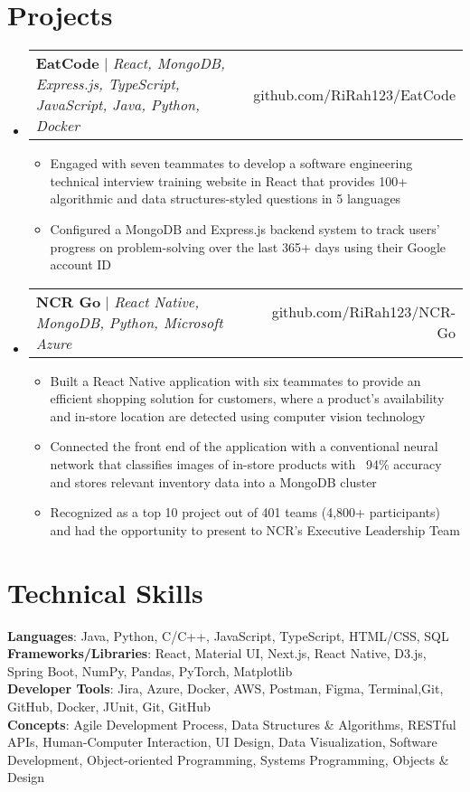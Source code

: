 \documentclass[letterpaper,10pt]{article}
\makeatletter
\newcommand{\resumeItem}[1]{
  \item\small{
    {#1 \vspace{-2pt}}
  }
}
\newcommand{\resumeProjectHeading}[2]{
    \item
    \begin{tabular*}{0.97\textwidth}{l@{\extracolsep{\fill}}r}
      \small#1 & #2 \\
    \end{tabular*}\vspace{-7pt}
}
\newcommand{\resumeSubHeadingListStart}{\begin{itemize}[leftmargin=0.15in, label={}]}
\newcommand{\resumeSubHeadingListEnd}{\end{itemize}}
\newcommand{\resumeItemListStart}{\begin{itemize}}
\newcommand{\resumeItemListEnd}{\end{itemize}\vspace{-5pt}}
\makeatother
\begin{document}
\section{Projects}
    \resumeSubHeadingListStart
      \resumeProjectHeading
          {\textbf{EatCode} $|$ \emph{React, MongoDB, Express.js, TypeScript, JavaScript, Java, Python, Docker}}{github.com/RiRah123/EatCode}
          \resumeItemListStart
            \resumeItem{Engaged with seven teammates to develop a software engineering technical interview training website in React that provides 100+ algorithmic and data structures-styled questions in 5 languages }
            \resumeItem{Configured a MongoDB and Express.js backend system to track users' progress on problem-solving over the last 365+ days using their Google account ID}
          \resumeItemListEnd
      
      \resumeProjectHeading
          {\textbf{NCR Go} $|$ \emph{React Native, MongoDB, Python, Microsoft Azure}}{github.com/RiRah123/NCR-Go}
          \resumeItemListStart
            \resumeItem{Built a React Native application with six teammates to provide an efficient shopping solution for customers, where a product’s availability and in-store location are detected using computer vision technology}
            \resumeItem{Connected the front end of the application with a conventional neural network that classifies images of in-store products with ~94\% accuracy and stores relevant inventory data into a MongoDB cluster}
            \resumeItem{Recognized as a top 10 project out of 401 teams (4,800+ participants) and had the opportunity to present to NCR's Executive Leadership Team}
          \resumeItemListEnd
    \resumeSubHeadingListEnd



%
\section{Technical Skills}
\begin{itemize}[leftmargin=0.15in, label={}]
    \small{\item{
        \textbf{Languages}{: Java, Python, C/C++, JavaScript, TypeScript, HTML/CSS, SQL} \\
        \textbf{Frameworks/Libraries}{: React, Material UI, Next.js, React Native, D3.js, Spring Boot, NumPy, Pandas, PyTorch, Matplotlib} \\
        \textbf{Developer Tools}{: Jira, Azure, Docker, AWS, Postman, Figma, Terminal,Git, GitHub, Docker, JUnit, Git, GitHub} \\
        \textbf{Concepts}{: Agile Development Process, Data Structures \& Algorithms, RESTful APIs, Human-Computer Interaction, UI Design, Data Visualization, Software Development, Object-oriented Programming, Systems Programming, Objects \& Design} \\
        }}
\end{itemize}



\end{document}
